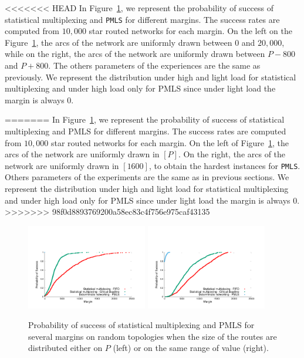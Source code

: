 \documentclass[a4paper,10pt]{article}
\newcommand\PMLS{\texttt{PMLS}\xspace}
\begin{document}
	    
<<<<<<< HEAD
     In Figure~\ref{fig:sto}, we represent the probability of success of statistical multiplexing and \PMLS for different margins. The success rates are computed from $10,000$ star routed networks for each margin. On the left on the Figure~\ref{fig:sto}, the arcs of the network are uniformly drawn between $0$ and $20,000$, while on the right, the arcs of the network are uniformly drawn between $P-800$ and $P+800$. The others parameters of the experiences are the same as previously. We represent the distribution under high and light load for statistical multiplexing and under high load only for PMLS since under light load the margin is always $0$. 
     
 
=======
   In Figure~\ref{fig:sto}, we represent the probability of success of statistical multiplexing and PMLS for different margins. The success rates are computed from $10,000$ star routed networks for each margin. On the left of Figure~\ref{fig:sto}, the arcs of the network are uniformly drawn in $[P]$. On the right, the arcs of the network are uniformly drawn in $[1600]$, to obtain the hardest instances for \PMLS. Others parameters of the experiments are the same as in previous sections. We represent the distribution under high and light load for statistical multiplexing and under high load only for PMLS since under light load the margin is always $0$. 
>>>>>>> 98f0d8893769200a58ec83c4f756e975caf43135
    \begin{figure}
    
   

       \begin{center}
      \includegraphics[width = 0.47\textwidth]{stochasticdistrib.pdf}
      \includegraphics[width = 0.47\textwidth]{stochastic.pdf}
     
       \end{center}
  \caption{Probability of success of statistical multiplexing and PMLS for several margins on random topologies when the size of the routes are distributed either on $P$ (left) or on the same range of value (right).}
      \label{fig:sto} 
      \end{figure}
      
\end{document}
